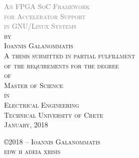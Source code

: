 \thispagestyle{empty}
\begin{center}
	\textsc{
	\textcolor{gray} {\Huge
		An FPGA SoC Framework \\
		for Accelerator Support \\
		in GNU/Linux Systems\\
	}
	\vspace{50pt}
	by\\
	\vspace{20pt}
	\large Ioannis Galanommatis\\
	\vspace{80pt}
		A thesis submitted in partial fulfillment\\
		of the requirements for the degree\\
		\vspace{12pt}
		of\\
		\vspace{12pt}
		{\large Master of Science\\}
		\vspace{12pt}
		in\\
		\vspace{12pt}
		{\large Electrical Engineering\\}
	}
	\vspace*{\fill}
	\textsc{\large Technical University of Crete\\January, 2018\\}
	
\end{center}

\newpage

\thispagestyle{empty}
\vspace*{\fill}
\scshape \noindent \small \copyright \small 2018 \hspace{3pt} -- Ioannis Galanommatis \\
\noindent edw h adeia xrisis
\vspace*{\fill}

\newpage
\rm


